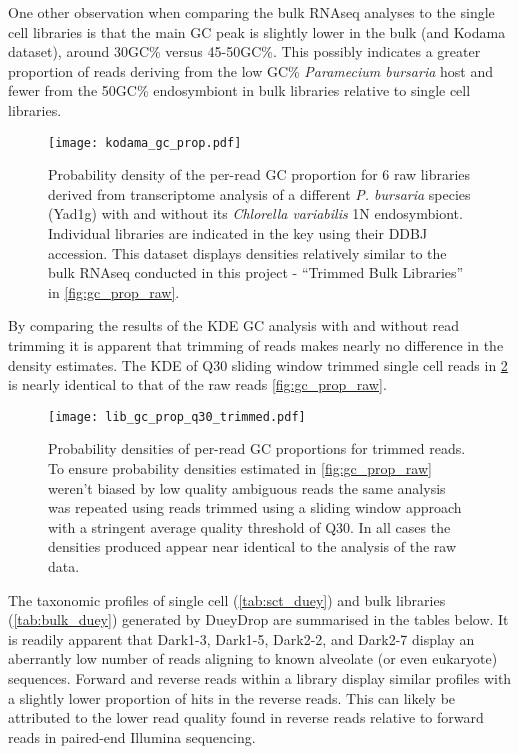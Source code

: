 One other observation when comparing the bulk RNAseq analyses to the single cell
libraries is that the main GC peak is slightly lower in the bulk (and Kodama dataset), 
around 30GC\% versus 45-50GC\%.
This possibly indicates a greater proportion of reads deriving from the low
GC\% \textit{Paramecium bursaria} host and fewer from the 50GC\% endosymbiont
in bulk libraries relative to single cell libraries.  

\begin{figure}[h!]
	\centering
    \texttt{[image: kodama\_gc\_prop.pdf]}
    \caption[GC densities of \textit{P. bursaria} Yad1g - \textit{C. variabilis} 1N]{Probability density of the per-read GC proportion for 6 raw libraries derived from
        \citep{Kodama2014} transcriptome analysis of a different \textit{P. bursaria} species (Yad1g)
        with and without its \textit{Chlorella variabilis} 1N endosymbiont. Individual libraries are indicated 
        in the key using their DDBJ accession.        
        This dataset displays densities relatively similar
to the bulk RNAseq conducted in this project - ``Trimmed Bulk Libraries'' in \cref{fig:gc_prop_raw}.}
    \label{fig:gc_prop_kodama}
\end{figure}

By comparing the results of the KDE GC analysis with and without read trimming it
is apparent that trimming of reads makes nearly no difference in the density estimates.
The KDE of Q30 sliding window trimmed single cell reads in \cref{fig:gc_prop_q30} is nearly
identical to that of the raw reads \cref{fig:gc_prop_raw}.

\begin{figure}[h!]
    \texttt{[image: lib\_gc\_prop\_q30\_trimmed.pdf]}
    \caption[GC Densities of Bulk Libraries]{Probability densities of per-read GC proportions for trimmed reads.
             To ensure probability densities estimated in \cref{fig:gc_prop_raw}
         weren't biased by low quality ambiguous reads the same analysis was
     repeated using reads trimmed using a sliding window approach with a stringent average
 quality threshold of Q30.  
 In all cases the densities produced appear near identical to
 the analysis of the raw data.}
    \label{fig:gc_prop_q30}
\end{figure}

The taxonomic profiles of single cell (\cref{tab:sct_duey}) and bulk libraries (\cref{tab:bulk_duey}) 
generated by DueyDrop are summarised in the tables below.  It is readily apparent 
that Dark1-3, Dark1-5, Dark2-2, and Dark2-7 display an aberrantly low number of reads
aligning to known alveolate (or even eukaryote) sequences. 
Forward and reverse reads within a library display similar profiles with a slightly
lower proportion of hits in the reverse reads. This can likely be attributed to
the lower read quality found in reverse reads relative to forward reads 
in paired-end Illumina sequencing. 

